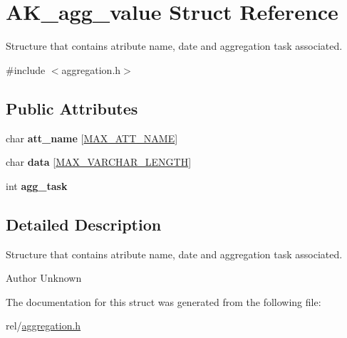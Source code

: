\hypertarget{structAK__agg__value}{}\section{A\+K\+\_\+agg\+\_\+value Struct Reference}
\label{structAK__agg__value}


Structure that contains atribute name, date and aggregation task associated.  




{\ttfamily \#include $<$aggregation.\+h$>$}

\subsection*{Public Attributes}
\begin{DoxyCompactItemize}
\item 
\mbox{\label{structAK__agg__value_a9df4167edf419cbd33e005a390385fb8}} 
char {\bfseries att\+\_\+name} \mbox{[}\hyperlink{constants_8h_ad221251e45ce1d6bfb3eff3b142c0fcd}{M\+A\+X\+\_\+\+A\+T\+T\+\_\+\+N\+A\+ME}\mbox{]}
\item 
\mbox{\label{structAK__agg__value_a9f87cbb26037fbabffea44d099fec5ff}} 
char {\bfseries data} \mbox{[}\hyperlink{constants_8h_a9de30df5b4220028fba997e5def2e9d7}{M\+A\+X\+\_\+\+V\+A\+R\+C\+H\+A\+R\+\_\+\+L\+E\+N\+G\+TH}\mbox{]}
\item 
\mbox{\label{structAK__agg__value_a3cdd683e1321dc4a9d3c5dd4900bfaa3}} 
int {\bfseries agg\+\_\+task}
\end{DoxyCompactItemize}


\subsection{Detailed Description}
Structure that contains atribute name, date and aggregation task associated. 

\begin{DoxyAuthor}{Author}
Unknown 
\end{DoxyAuthor}


The documentation for this struct was generated from the following file\+:\begin{DoxyCompactItemize}
\item 
rel/\hyperlink{aggregation_8h}{aggregation.\+h}\end{DoxyCompactItemize}
